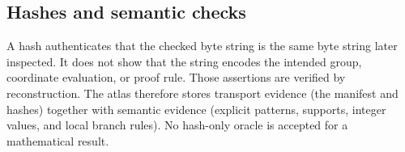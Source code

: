 \subsection{Hashes and semantic checks}

A hash authenticates that the checked byte string is the same byte string
later inspected.  It does not show that the string encodes the intended group,
coordinate evaluation, or proof rule.  Those assertions are verified by
reconstruction.  The atlas therefore stores transport evidence (the manifest
and hashes) together with semantic evidence (explicit patterns, supports,
integer values, and local branch rules).  No hash-only oracle is accepted for
a mathematical result.
